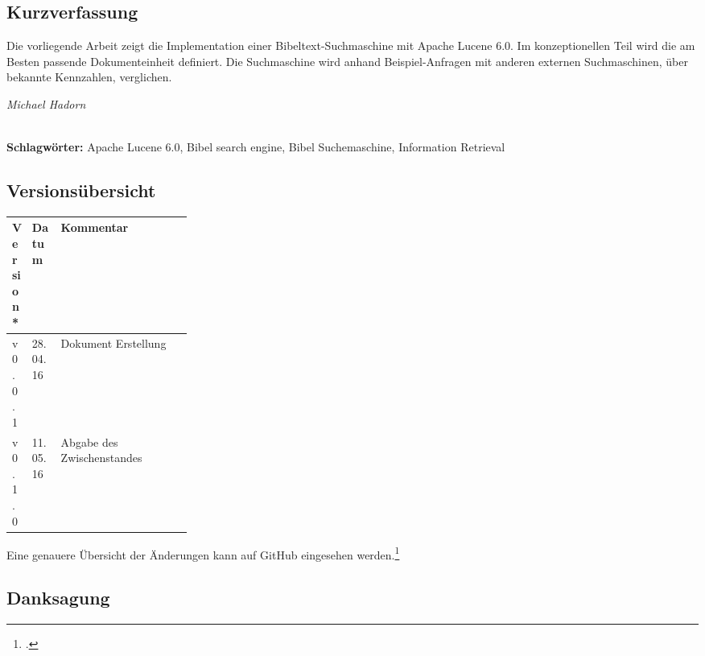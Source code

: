 
\subsection*{Kurzverfassung}
Die vorliegende Arbeit zeigt die Implementation einer Bibeltext-Suchmaschine mit Apache Lucene 6.0.
Im konzeptionellen Teil wird die am Besten passende Dokumenteinheit definiert.
Die Suchmaschine wird anhand Beispiel-Anfragen mit anderen externen Suchmaschinen, über bekannte Kennzahlen, verglichen.

\begin{flushright}
	\textit{Michael Hadorn}	
\end{flushright}

\vfill

%
\mbox{}\\[0.5\baselineskip]\noindent
\textbf{Schlagwörter:} 
Apache Lucene 6.0, Bibel search engine, Bibel Suchemaschine, Information Retrieval

\newpage
\subsection*{Versionsübersicht}
\begin{center}
	\centering
	\small\renewcommand{\arraystretch}{1.4}
	\begin{tabularx}{1.0\textwidth}{ R{0.1\linewidth} | R{0.16\linewidth} | X  }%
		\hline
		\textbf{Version*} & \textbf{Datum} & \textbf{Kommentar}\\
		\hline\hline
		v0.0.1 & 28.04.16 & Dokument Erstellung \\
		v0.1.0 & 11.05.16 & Abgabe des Zwischenstandes \\
		\hline\hline
	\end{tabularx}
\end{center}
\vspace{-1.0\baselineskip}
{\footnotesize * Eine genauere Übersicht der Änderungen kann auf GitHub eingesehen werden.\footcite{github_bibleSearch_2016-05-07}}

\vfill

\subsection*{Danksagung}
